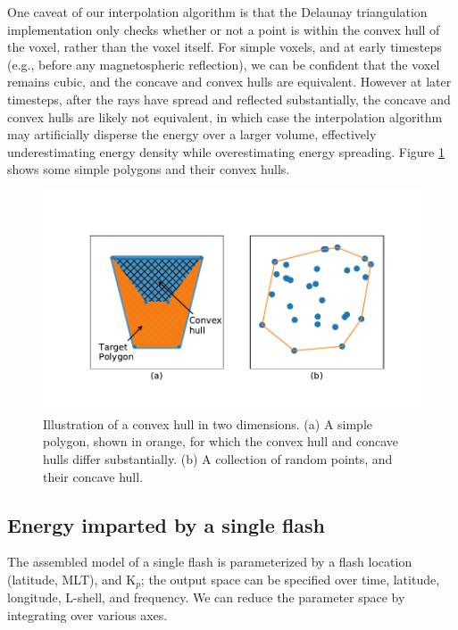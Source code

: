 One caveat of our interpolation algorithm is that the Delaunay triangulation implementation only checks whether or not a point is within the convex hull of the voxel, rather than the voxel itself. For simple voxels, and at early timesteps (e.g., before any magnetospheric reflection), we can be confident that the voxel remains cubic, and the concave and convex hulls are equivalent. However at later timesteps, after the rays have spread and reflected substantially, the concave and convex hulls are likely not equivalent, in which case the interpolation algorithm may artificially disperse the energy over a larger volume, effectively underestimating energy density while overestimating energy spreading. Figure \ref{fig:convex_hulls} shows some simple polygons and their convex hulls.
\begin{figure}[h]
\begin{center}
\includegraphics{figures/convex_hulls.pdf}
\caption{Illustration of a convex hull in two dimensions. (a) A simple polygon, shown in orange, for which the convex hull and concave hulls differ substantially. (b) A collection of random points, and their concave hull.}
\label{fig:convex_hulls}
\end{center}
\end{figure}


\subsection{Energy imparted by a single flash}
The assembled model of a single flash is parameterized by a flash location (latitude, MLT), and K$_p$; the output space can be specified over time, latitude, longitude, L-shell, and frequency. We can reduce the parameter space by integrating over various axes.


